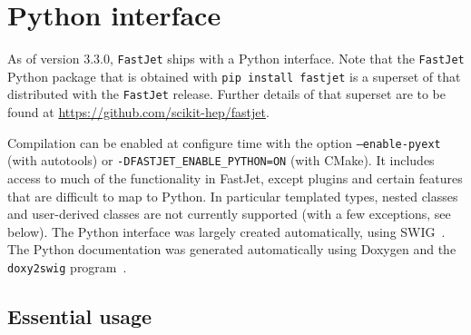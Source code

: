 \documentclass[12pt,a4]{article}
\newcommand{\fastjet}{\texttt{FastJet}\xspace}
\newcommand{\ttt}[1]{{\small\texttt{#1}}}
\begin{document}
\section{Python interface}

As of version 3.3.0, \fastjet ships with a Python interface.
%
Note that the \fastjet Python package that is obtained with \ttt{pip
  install fastjet} is a superset of that distributed with the \fastjet
release. Further details of that superset are to be found at
\url{https://github.com/scikit-hep/fastjet}.

%
Compilation can be enabled at configure time with the option
\ttt{--enable-pyext} (with autotools) or
\ttt{-DFASTJET\_ENABLE\_PYTHON=ON} (with CMake).
%
It includes access to much of the functionality in FastJet, except
plugins and certain features that are difficult to map to Python.
%
In particular templated types, nested classes and user-derived classes
are not currently supported (with a few exceptions, see below).
%
The Python interface was largely created automatically, using
SWIG~\cite{swig}.
%
The Python documentation was generated automatically using Doxygen and
the \ttt{doxy2swig} program~\cite{doxy2swig}.

\subsection{Essential usage}
\label{sec:python-essential-usage}
\end{document}
